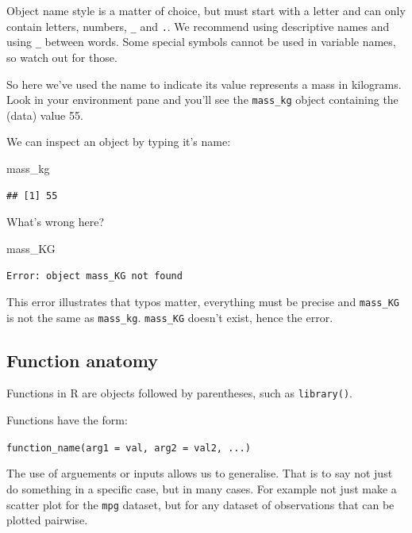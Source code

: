 \documentclass[12pt,]{book}
\newenvironment{Shaded}{\begin{snugshade}}{\end{snugshade}}
\newcommand{\NormalTok}[1]{#1}
\begin{document}
Object name style is a matter of choice, but must start with a letter and can
only contain letters, numbers, \texttt{\_} and \texttt{.}. We recommend using descriptive names
and using \texttt{\_} between words. Some special symbols cannot be used in variable
names, so watch out for those.

So here we've used the name to indicate its value represents a mass in kilograms.
Look in your environment pane and you'll see the \texttt{mass\_kg} object
containing the (data) value 55.

We can inspect an object by typing it's name:

\begin{Shaded}
\begin{Highlighting}[]
\NormalTok{mass_kg}
\end{Highlighting}
\end{Shaded}

\begin{verbatim}
## [1] 55
\end{verbatim}

What's wrong here?

\begin{Shaded}
\begin{Highlighting}[]
\NormalTok{mass_KG}
\end{Highlighting}
\end{Shaded}

\texttt{Error:\ object\ \textquotesingle{}mass\_KG\textquotesingle{}\ not\ found}

This error illustrates that typos matter, everything must be precise and \texttt{mass\_KG}
is not the same as \texttt{mass\_kg}. \texttt{mass\_KG} doesn't exist, hence the error.

\hypertarget{function-anatomy}{%
\subsection{Function anatomy}\label{function-anatomy}}

Functions in R are objects followed by parentheses, such as \texttt{library()}.

Functions have the form:

\texttt{function\_name(arg1\ =\ val,\ arg2\ =\ val2,\ ...)}

The use of arguements or inputs allows us to generalise. That is to say not
just do something in a specific case, but in many cases. For example not just
make a scatter plot for the \texttt{mpg} dataset, but for any dataset of observations
that can be plotted pairwise.
\end{document}
